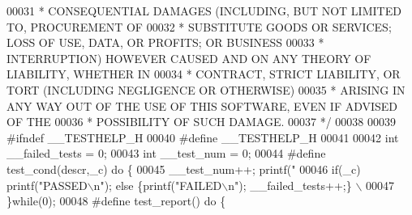 \begin{DoxyCode}
00031 \textcolor{comment}{ * CONSEQUENTIAL DAMAGES (INCLUDING, BUT NOT LIMITED TO, PROCUREMENT OF}
00032 \textcolor{comment}{ * SUBSTITUTE GOODS OR SERVICES; LOSS OF USE, DATA, OR PROFITS; OR BUSINESS}
00033 \textcolor{comment}{ * INTERRUPTION) HOWEVER CAUSED AND ON ANY THEORY OF LIABILITY, WHETHER IN}
00034 \textcolor{comment}{ * CONTRACT, STRICT LIABILITY, OR TORT (INCLUDING NEGLIGENCE OR OTHERWISE)}
00035 \textcolor{comment}{ * ARISING IN ANY WAY OUT OF THE USE OF THIS SOFTWARE, EVEN IF ADVISED OF THE}
00036 \textcolor{comment}{ * POSSIBILITY OF SUCH DAMAGE.}
00037 \textcolor{comment}{ */}
00038 
00039 \textcolor{preprocessor}{#}\textcolor{preprocessor}{ifndef} \textcolor{preprocessor}{\_\_TESTHELP\_H}
00040 \textcolor{preprocessor}{#}\textcolor{preprocessor}{define} \textcolor{preprocessor}{\_\_TESTHELP\_H}
00041 
00042 \textcolor{keywordtype}{int} \_\_failed\_tests = 0;
00043 \textcolor{keywordtype}{int} \_\_test\_num = 0;
00044 \textcolor{preprocessor}{#}\textcolor{preprocessor}{define} \textcolor{preprocessor}{test\_cond}\textcolor{preprocessor}{(}\textcolor{preprocessor}{descr}\textcolor{preprocessor}{,}\textcolor{preprocessor}{\_c}\textcolor{preprocessor}{)} \textcolor{keywordflow}{do} \textcolor{preprocessor}{\{}
00045     \textcolor{preprocessor}{\_\_test\_num}\textcolor{preprocessor}{++}\textcolor{preprocessor}{;} \textcolor{preprocessor}{printf}\textcolor{preprocessor}{(}\textcolor{stringliteral}{"%
00046     \textcolor{keywordflow}{if}\textcolor{preprocessor}{(}\textcolor{preprocessor}{\_c}\textcolor{preprocessor}{)} \textcolor{preprocessor}{printf}\textcolor{preprocessor}{(}\textcolor{stringliteral}{"PASSED\(\backslash\)n"}\textcolor{preprocessor}{)}\textcolor{preprocessor}{;} \textcolor{keywordflow}{else} \textcolor{preprocessor}{\{}\textcolor{preprocessor}{printf}\textcolor{preprocessor}{(}\textcolor{stringliteral}{"FAILED\(\backslash\)n"}\textcolor{preprocessor}{)}\textcolor{preprocessor}{;} \textcolor{preprocessor}{\_\_failed\_tests}\textcolor{preprocessor}{++}\textcolor{preprocessor}{;}\textcolor{preprocessor}{\}} \textcolor{preprocessor}{\(\backslash\)}
00047 \textcolor{preprocessor}{\}}\textcolor{keywordflow}{while}\textcolor{preprocessor}{(}0\textcolor{preprocessor}{)}\textcolor{preprocessor}{;}
00048 \textcolor{preprocessor}{#}\textcolor{preprocessor}{define} \textcolor{preprocessor}{test\_report}\textcolor{preprocessor}{(}\textcolor{preprocessor}{)} \textcolor{keywordflow}{do} \textcolor{preprocessor}{\{}
}
\end{DoxyCode}
